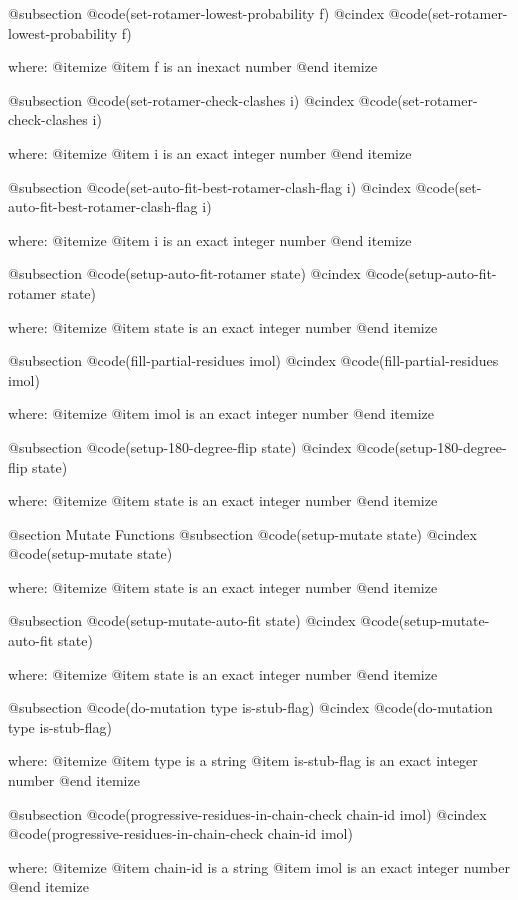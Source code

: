 @subsection @code{(set-rotamer-lowest-probability f)}
@cindex @code{(set-rotamer-lowest-probability f)}
 
where: 
 @itemize 
     @item f is an inexact number
 @end itemize


@subsection @code{(set-rotamer-check-clashes i)}
@cindex @code{(set-rotamer-check-clashes i)}
 
where: 
 @itemize 
     @item i is an exact integer number
 @end itemize


@subsection @code{(set-auto-fit-best-rotamer-clash-flag i)}
@cindex @code{(set-auto-fit-best-rotamer-clash-flag i)}
 
where: 
 @itemize 
     @item i is an exact integer number
 @end itemize


@subsection @code{(setup-auto-fit-rotamer state)}
@cindex @code{(setup-auto-fit-rotamer state)}
 
where: 
 @itemize 
     @item state is an exact integer number
 @end itemize


@subsection @code{(fill-partial-residues imol)}
@cindex @code{(fill-partial-residues imol)}
 
where: 
 @itemize 
     @item imol is an exact integer number
 @end itemize


@subsection @code{(setup-180-degree-flip state)}
@cindex @code{(setup-180-degree-flip state)}
 
where: 
 @itemize 
     @item state is an exact integer number
 @end itemize



@section Mutate Functions 
@subsection @code{(setup-mutate state)}
@cindex @code{(setup-mutate state)}
 
where: 
 @itemize 
     @item state is an exact integer number
 @end itemize


@subsection @code{(setup-mutate-auto-fit state)}
@cindex @code{(setup-mutate-auto-fit state)}
 
where: 
 @itemize 
     @item state is an exact integer number
 @end itemize


@subsection @code{(do-mutation type is-stub-flag)}
@cindex @code{(do-mutation type is-stub-flag)}
 
where: 
 @itemize 
     @item type is a string
     @item is-stub-flag is an exact integer number
 @end itemize


@subsection @code{(progressive-residues-in-chain-check chain-id imol)}
@cindex @code{(progressive-residues-in-chain-check chain-id imol)}
 
where: 
 @itemize 
     @item chain-id is a string
     @item imol is an exact integer number
 @end itemize


